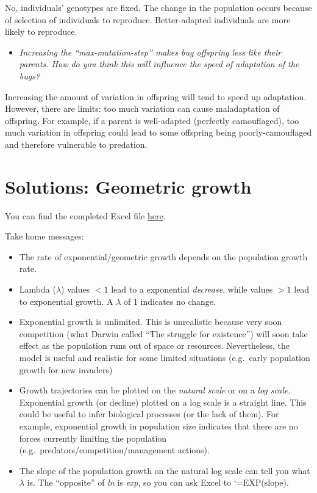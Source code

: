 \documentclass[
  a4paper]{book}
\providecommand{\tightlist}{%
  \setlength{\itemsep}{0pt}\setlength{\parskip}{0pt}}
\begin{document}
No, individuals' genotypes are fixed. The change in the population occurs because of selection of individuals to reproduce. Better-adapted individuals are more likely to reproduce.

\begin{itemize}
\tightlist
\item
  \emph{Increasing the ``max-mutation-step'' makes bug offspring less like their parents. How do you think this will influence the speed of adaptation of the bugs?}
\end{itemize}

Increasing the amount of variation in offspring will tend to speed up adaptation. However, there are limits: too much variation can cause maladaptation of offspring. For example, if a parent is well-adapted (perfectly camouflaged), too much variation in offspring could lead to some offspring being poorly-camouflaged and therefore vulnerable to predation.

\hypertarget{solutions-geometric-growth}{%
\section{Solutions: Geometric growth}\label{solutions-geometric-growth}}

You can find the completed Excel file \href{https://www.dropbox.com/s/sfxu1lbrxyqt462/GeometricGrowth\%20-\%20complete.xlsx?dl=1}{here}.

Take home messages:

\begin{itemize}
\tightlist
\item
  The rate of exponential/geometric growth depends on the population growth rate.
\item
  Lambda (\(\lambda\)) values \(<1\) lead to a exponential \emph{decrease}, while values \(>1\) lead to exponential growth. A \(\lambda\) of 1 indicates no change.
\item
  Exponential growth is unlimited. This is unrealistic because very soon competition (what Darwin called ``The struggle for existence'') will soon take effect as the population runs out of space or resources. Nevertheless, the model is useful and realistic for some limited situations (e.g.~early population growth for new invaders)
\item
  Growth trajectories can be plotted on the \emph{natural scale} or on a \emph{log scale}. Exponential growth (or decline) plotted on a log scale is a straight line. This could be useful to infer biological processes (or the lack of them). For example, exponential growth in population size indicates that there are no forces currently limiting the population (e.g.~predators/competition/management actions).
\item
  The slope of the population growth on the natural log scale can tell you what \(\lambda\) is. The ``opposite'' of \emph{ln} is \emph{exp}, so you can ask Excel to `=EXP(slope).
\end{itemize}
\end{document}
